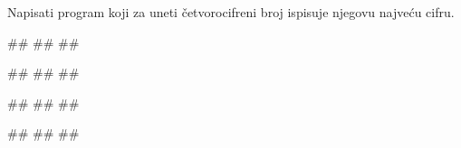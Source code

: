 \begin{Exercise}[label=p1.2_01] 
Napisati program koji za uneti četvorocifreni broj ispisuje njegovu najveću cifru. 

\begin{miditest}
\begin{upotreba}{1}
#\naslovInt#
##
##
\end{upotreba}
\end{miditest}
\begin{miditest}
\begin{upotreba}{2}
#\naslovInt#
##
##
\end{upotreba}
\end{miditest}

\begin{miditest}
\begin{upotreba}{3}
#\naslovInt#
##
##
\end{upotreba}
\end{miditest}
\begin{miditest}
\begin{upotreba}{4}
#\naslovInt#
##
##
\end{upotreba}
\end{miditest}

\end{Exercise}
\ifresenja
 \begin{Answer}[ref=p1.2_01]
\end{Answer}
\fi

